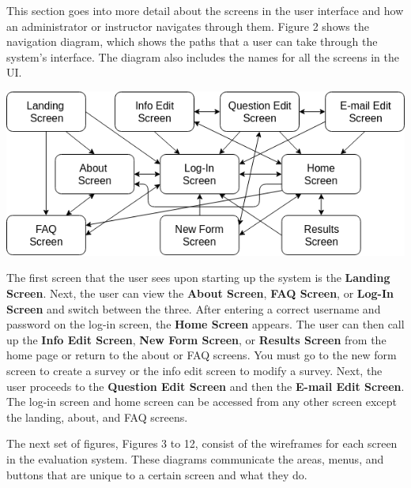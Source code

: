 \documentclass{article}
\begin{document}
This section goes into more detail about the screens in the user interface and how an administrator or instructor navigates through them. Figure 2 shows the navigation diagram, which shows the paths that a user can take through the system's interface. The diagram also includes the names for all the screens in the UI. 

\begin{center}
\vspace{3mm}
{\includegraphics[width=6.5in]{images/navigation_diagram.png}}
\vspace{2mm}
\end{center} 

The first screen that the user sees upon starting up the system is the \textbf{Landing Screen}. Next, the user can view the \textbf{About Screen}, \textbf{FAQ Screen}, or  \textbf{Log-In Screen} and switch between the three. After entering a correct username and password on the log-in screen, the \textbf{Home Screen} appears. The user can then call up the \textbf{Info Edit Screen}, \textbf{New Form Screen}, or \textbf{Results Screen} from the home page or return to the about or FAQ screens. You must go to the new form screen to create a survey or the info edit screen to modify a survey. Next, the user proceeds to the \textbf{Question Edit Screen} and then the \textbf{E-mail Edit Screen}. The log-in screen and home screen can be accessed from any other screen except the landing, about, and FAQ screens.

The next set of figures, Figures 3 to 12, consist of the wireframes for each screen in the evaluation system. These diagrams communicate the areas, menus, and buttons that are unique to a certain screen and what they do.

\newpage
{}
\end{document}
